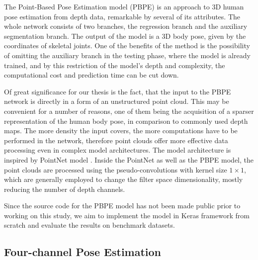 The Point-Based Pose Estimation model (PBPE) \cite{Ali19} is an approach to 3D human pose estimation from depth data, remarkable by several of its attributes. The whole network consists of two branches, the regression branch and the auxiliary segmentation branch. The output of the model is a 3D body pose, given by the coordinates of skeletal joints. One of the benefits of the method is the possibility of omitting the auxiliary branch in the testing phase, where the model is already trained, and by this restriction of the model's depth and complexity, the computational cost and prediction time can be cut down.\par
\vspace{5mm}
\noindent Of great significance for our thesis is the fact, that the input to the PBPE network is directly in a form of an unstructured point cloud. This may be convenient for a number of reasons, one of them being the acquisition of a sparser representation of the human body pose, in comparison to commonly used depth maps. The more density the input covers, the more computations have to be performed in the network, therefore point clouds offer more effective data processing even in complex model architectures. The model architecture is inspired by PointNet model \cite{DBLP:journals/corr/QiSMG16}. Inside the PointNet as well as the PBPE model, the point clouds are processed using the pseudo-convolutions with kernel size $1 \times 1$, which are generally employed to change the filter space dimensionality, mostly reducing the number of depth channels.\par %
\vspace{5mm}
\noindent Since the source code for the PBPE model has not been made public prior to working on this study, we aim to implement the model in Keras framework from scratch and evaluate the results on benchmark datasets.

\subsection{Four-channel Pose Estimation}


